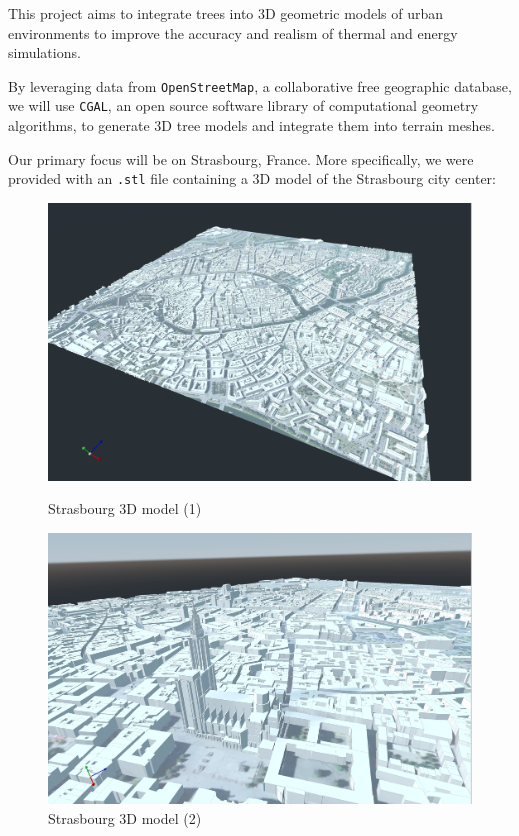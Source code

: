 \documentclass[12pt]{article}
\begin{document}
This project aims to integrate trees into 3D geometric models of urban
environments to improve the accuracy and realism of thermal and energy
simulations.

By leveraging data from \texttt{OpenStreetMap}\cite{openstreetmap}, a
collaborative free geographic database, we will use \texttt{CGAL}\cite{cgal},
an open source software library of computational geometry algorithms,
to generate 3D tree models and integrate them into terrain meshes.

Our primary focus will be on Strasbourg, France. More specifically, we were
provided with an \texttt{.stl}\cite{stl} file containing a 3D model of the
Strasbourg city center:

\begin{figure}[H]
    \centering
    \begin{minipage}{0.45\textwidth}
      \centering
      \includegraphics[width=1\textwidth]{images/strasbourg-mesh-1.png}
      \caption{Strasbourg 3D model (1)}
    \end{minipage}
    \begin{minipage}{0.45\textwidth}
      \centering
      \includegraphics[width=1\textwidth]{images/strasbourg-mesh-2.png}
      \caption{Strasbourg 3D model (2)}
    \end{minipage}
\end{figure}
\end{document}
